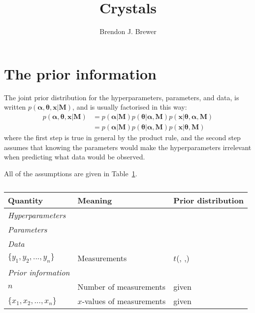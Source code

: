 \documentclass[a4paper, 12pt]{article}
\title{Crystals}
\author{Brendon J. Brewer}
\date{}
\newcommand{\hypers}{\boldsymbol{\alpha}}
\newcommand{\params}{\boldsymbol{\theta}}
\newcommand{\data}{\boldsymbol{x}}
\newcommand{\info}{\boldsymbol{M}}
\begin{document}
\maketitle


\setlength{\parindent}{0pt}
\setlength{\parskip}{8pt}

\section{The prior information}

The joint prior distribution for the hyperparameters, parameters, and data,
is written $p(\hypers, \params, \data | \info)$, and is usually factorised
in this way:
\begin{align}
p(\hypers, \params, \data | \info) &=
    p(\hypers | \info)p(\params | \hypers, \info)
    p(\data | \params, \hypers, \info)\\
    &= p(\hypers | \info)p(\params | \hypers, \info)
    p(\data | \params, \info)
\end{align}
where the first step is true in general by the product rule, and the second
step assumes that knowing the parameters would make the hyperparameters
irrelevant when predicting what data would be observed.

All of the assumptions are given in Table~\ref{tab:priors}.

\begin{table}
\centering
\begin{tabular}{|lll|}
\hline
{\bf Quantity}      &   {\bf Meaning}   &  {\bf Prior distribution}\\
\hline
{\em Hyperparameters} & &\\
\hline
{\em Parameters}& &\\
\hline
{\em Data}&&\\
\hline
$\{y_1, y_2, ..., y_n\}$  &   Measurements    & $t$(, ,)\\
\hline
{\em Prior information}&&\\
\hline
$n$ & Number of measurements & given\\
$\{x_1, x_2, ..., x_n\}$  & $x$-values of measurements & given \\

\hline
\end{tabular}
\caption{\label{tab:priors}}
\end{table}





\end{document}
